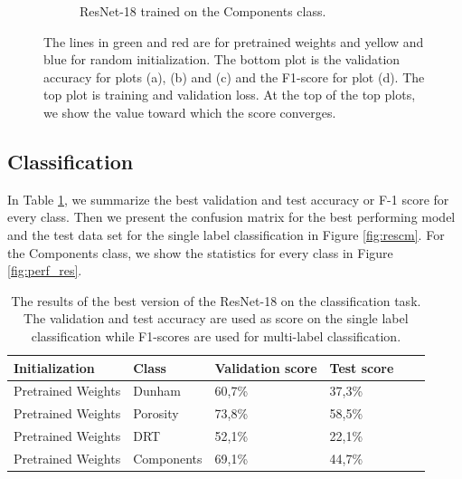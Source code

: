 \begin{figure}
{\begin{subfigure}[b]{.6\textwidth}
\caption{ResNet-18 trained on the Components class.}
\label{fig:resinit_comp}
\end{subfigure}%
}
\caption[Training and validation plots for ResNet-18]{The lines in green and red are for pretrained weights and yellow and blue for random initialization. The bottom plot is the validation accuracy for plots (a), (b) and (c) and the F1-score for plot (d). The top plot is training  and validation loss. At the top of the top plots, we show the value toward which the score converges.}
\label{fig:plotres}
\end{figure}

\subsection{Classification}
In Table \ref{tab:resbest}, we summarize the best validation and test accuracy or F-1 score for every class. Then we present the confusion matrix for the best performing model and the test data set for the single label classification in Figure \ref{fig:rescm}. For the Components class, we show the statistics for every class in Figure \ref{fig:perf_res}. 

\begin{table}
\caption[Scores of best performing ResNet-18]{\label{tab:resbest} The results of the best version of the ResNet-18 on the classification task. The validation and test accuracy are used as score on the single label classification while F1-scores are used for multi-label classification.}
\centering
\begin{tabular}[b]{| l | l | l | l | l |}
\hline
    Initialization & Class & Validation score & Test score \ \\ \hline
    Pretrained Weights & Dunham &  60,7\%  & 37,3\% \\ \hline
    Pretrained Weights & Porosity & 73,8\%  &  58,5\% \\ \hline
    Pretrained Weights &DRT & 52,1\% &  22,1\% \\ \hline
    Pretrained Weights &Components & 69,1\% &  44,7\% \\ \hline
\end{tabular} 
\end{table}

